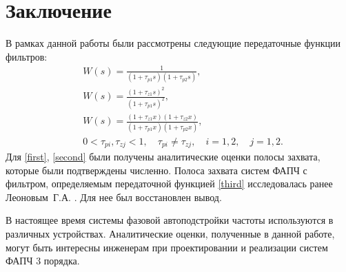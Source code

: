 \documentclass[a4paper,article,14pt]{extarticle}
\begin{document}
\pagebreak
\section{Заключение}
В рамках данной работы были рассмотрены следующие передаточные функции фильтров: 
 \begin{align}
&W(s) = \frac{1}{(1+\tau_{p1}s)(1+\tau_{p2}s)},\label{first}\\[5pt]
&W(s) = \frac{(1+\tau_{z1}s)^2}{(1+\tau_{p1}s)^2},\label{second}\\[5pt]
&W(s) = \frac{(1+\tau_{z1}x)(1+\tau_{z2}x)}{(1+\tau_{p1}x)(1+\tau_{p2}x)},\label{third}\\
&0<\tau_{pi},\tau_{zj} < 1, \quad \tau_{pi} \neq \tau_{zj}, \quad i=1,2, \quad j=1,2.
 \end{align}
 Для \eqref{first}, \eqref{second} были получены аналитические оценки полосы захвата, которые были подтверждены численно. Полоса захвата систем ФАПЧ с фильтром, определяемым передаточной функцией \eqref{third} исследовалась ранее Леоновым~Г.\:А. \cite{kuznetsov}. Для нее был восстановлен вывод. 
 
 В настоящее время системы фазовой автоподстройки частоты используются в различных устройствах. Аналитические оценки, полученные в данной работе, могут быть интересны инженерам при проектировании и реализации систем ФАПЧ 3 порядка.
 
 \pagebreak
{}







 
\end{document}
